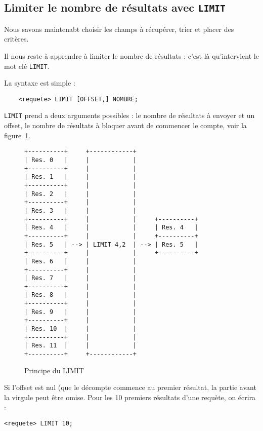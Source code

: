 \documentclass[a4paper, 11pt]{report}
\begin{document}
\subsection{Limiter le nombre de résultats avec \texttt{LIMIT}}

Nous savons maintenabt choisir les champs à récupérer, trier et placer des critères.

Il nous reste à apprendre à limiter le nombre de résultats : c'est là qu'intervient le mot clé \texttt{LIMIT}.

La syntaxe est simple :

\begin{verbatim}
    <requete> LIMIT [OFFSET,] NOMBRE;
\end{verbatim}

\texttt{LIMIT} prend a deux arguments possibles : le nombre de résultats à envoyer et un offset, le nombre de résultats
à bloquer avant de commencer le compte, voir la figure~\ref{limit}.

\begin{figure}
\begin{verbatim}
+----------+     +------------+
| Res. 0   |     |            |
+----------+     |            |
| Res. 1   |     |            |
+----------+     |            |
| Res. 2   |     |            |
+----------+     |            |
| Res. 3   |     |            |
+----------+     |            |     +----------+
| Res. 4   |     |            |     | Res. 4   |
+----------+     |            |     +----------+
| Res. 5   | --> | LIMIT 4,2  | --> | Res. 5   |
+----------+     |            |     +----------+
| Res. 6   |     |            |
+----------+     |            |
| Res. 7   |     |            |
+----------+     |            |
| Res. 8   |     |            |
+----------+     |            |
| Res. 9   |     |            |
+----------+     |            |
| Res. 10  |     |            |
+----------+     |            |
| Res. 11  |     |            |
+----------+     +------------+
\end{verbatim}
\caption{Principe du LIMIT}
\label{limit}
\end{figure}

Si l'offset est nul (que le décompte commence au premier résultat, la partie avant la virgule peut être omise.
Pour les 10 premiers résultats d'une requète, on écrira :

\begin{verbatim}
<requete> LIMIT 10;
\end{verbatim}
\end{document}
